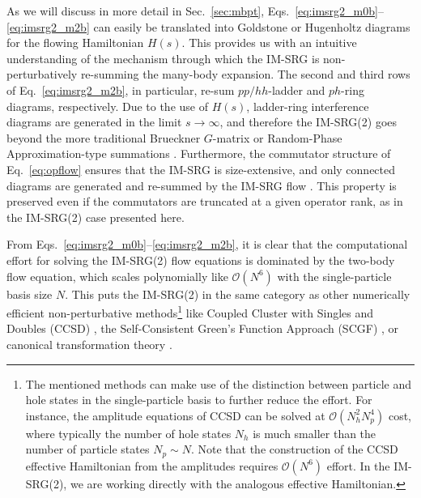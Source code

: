 As we will discuss in more detail in Sec.~\ref{sec:mbpt}, 
Eqs.~\eqref{eq:imsrg2_m0b}--\eqref{eq:imsrg2_m2b} can easily be translated 
into Goldstone or Hugenholtz diagrams for the flowing Hamiltonian $H(s)$.
This provides us with an intuitive understanding of the mechanism through
which the IM-SRG is non-perturbatively re-summing the many-body expansion. The second
and third rows of Eq.~\eqref{eq:imsrg2_m2b}, in particular, re-sum $pp/hh$-ladder and $ph$-ring 
diagrams, respectively. Due to the use of $H(s)$, ladder-ring interference 
diagrams are generated in the limit $s\to\infty$, and therefore the IM-SRG(2) 
goes beyond the more traditional Brueckner $G$-matrix or Random-Phase 
Approximation-type summations \cite{Day:1967zl,Brandow:1967tg,Fetter:2003ve}. 
Furthermore, the commutator structure of Eq.~\eqref{eq:opflow} ensures that 
the IM-SRG is size-extensive, and only connected diagrams are generated and
re-summed by the IM-SRG flow \cite{Brandow:1967tg,Shavitt:2009}. This property
is preserved even if the commutators are truncated at a given operator rank, as in the IM-SRG(2) case presented here. 

From Eqs.~\eqref{eq:imsrg2_m0b}--\eqref{eq:imsrg2_m2b}, it is clear
that the computational effort for solving the IM-SRG(2) flow equations
is dominated by the two-body flow equation, which scales polynomially
like $\mathcal{O}(N^6)$ with the single-particle basis size $N$. This puts the
IM-SRG(2) in the same category as other numerically efficient
non-perturbative methods\footnote{The mentioned methods can make use
  of the distinction between particle and hole states in the
  single-particle basis to further reduce the effort. For instance,
  the amplitude equations of CCSD can be solved at $\mathcal{O}(N_h^2N_p^4)$
  cost, where typically the number of hole states $N_h$ is much
  smaller than the number of particle states $N_p\sim N$. Note that
  the construction of the CCSD effective Hamiltonian from the
  amplitudes requires $\mathcal{O}(N^6)$ effort. In the IM-SRG(2), we are
  working directly with the analogous effective Hamiltonian.} like
Coupled Cluster with Singles and Doubles (CCSD)
\cite{Shavitt:2009,Hagen:2014ve}, the Self-Consistent Green's Function
Approach (SCGF)
\cite{Dickhoff:2004fk,Barbieri:2007fk,Cipollone:2013uq}, or canonical
transformation theory \cite{White:2002fk,Yanai:2006uq}.

